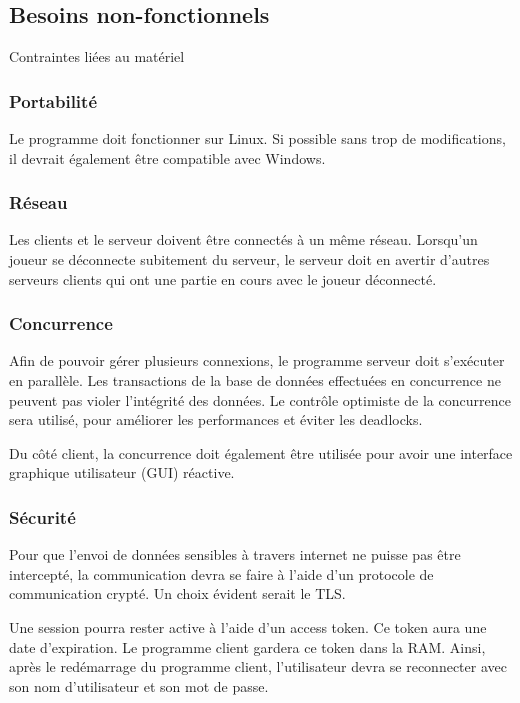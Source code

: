 \documentclass[french, utf8]{article}
\begin{document}
\subsection{Besoins non-fonctionnels}
Contraintes liées au matériel

\subsubsection{Portabilité}

Le programme doit fonctionner sur Linux. Si possible sans trop de modifications, il devrait également être compatible avec Windows.

\subsubsection{Réseau}

Les clients et le serveur doivent être connectés à un même réseau. Lorsqu'un joueur se déconnecte subitement du serveur, le serveur doit en avertir d'autres serveurs clients qui ont une partie en cours avec le joueur déconnecté.

\subsubsection{Concurrence}

Afin de pouvoir gérer plusieurs connexions, le programme serveur doit s'exécuter en parallèle. Les transactions de la base de données effectuées en concurrence ne peuvent pas violer l'intégrité des données. Le contrôle optimiste de la concurrence sera utilisé, pour améliorer les performances et éviter les deadlocks.

Du côté client, la concurrence doit également être utilisée pour avoir une interface graphique utilisateur (GUI) réactive.

\subsubsection{Sécurité}

Pour que l'envoi de données sensibles à travers internet ne puisse pas être intercepté, la communication devra se faire à l'aide d'un protocole de communication crypté. Un choix évident serait le TLS.

Une session pourra rester active à l'aide d'un access token.
Ce token aura une date d'expiration. Le programme client gardera ce token dans la RAM.
Ainsi, après le redémarrage du programme client, l'utilisateur devra se reconnecter avec son nom d'utilisateur et son mot de passe.
\end{document}
